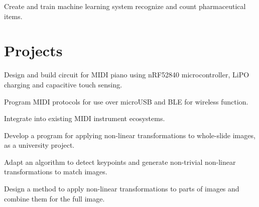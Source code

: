 \documentclass{deedy-resume-reversed}
\begin{document}
\begin{minipage}[t]{0.60\textwidth}
\begin{tightemize}
\item Create and train machine learning system recognize and count pharmaceutical items.
\end{tightemize}
\sectionsep


\section{Projects}
\begin{tightemize}
\item Design and build circuit for MIDI piano using nRF52840 microcontroller, LiPO charging and capacitive touch sensing.
\item Program MIDI protocols for use over microUSB and BLE for wireless function.
\item Integrate into existing MIDI instrument ecosystems. 
\end{tightemize}
\sectionsep

\begin{tightemize}
\item Develop a program for applying non-linear transformations to whole-slide images, as a university project.
\item Adapt an algorithm to detect keypoints and generate non-trivial non-linear transformations to match images.
\item Design a method to apply non-linear transformations to parts of images and combine them for the full image.
\end{tightemize}
\sectionsep




\end{minipage}
\end{document}
